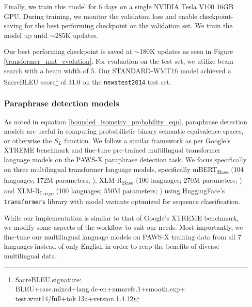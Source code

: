 \documentclass[11pt,a4paper]{article}
\begin{document}
Finally, we train this model for 6 days on a single NVIDIA Tesla V100 16GB GPU.
During training, we monitor the validation loss and enable checkpoint-saving for
the best performing checkpoint on the validation set. We train the model up
until $\sim$285K updates.

Our best performing checkpoint is saved at $\sim$180K updates as seen in Figure
\ref{transformer_nmt_evolution}. For evaluation on the test set, we utilize beam
search with a beam width of 5. Our STANDARD-WMT16 model achieved a SacreBLEU
\cite{post-2018-call} score\footnote{\footnotesize SacreBLEU
  signature:\\BLEU+case.mixed+lang.de\nobreakdash-en+numrefs.1+smooth.exp+\\test.wmt14/full+tok.13a+version.1.4.12}
of 31.0 on the \texttt{newstest2014} test set.

\subsubsection{Paraphrase detection models}

As noted in equation \ref{bounded_isometry_probability_eqn}, paraphrase
detection models are useful in computing probabilistic binary semantic
equivalence spaces, or otherwise the $S_L$ function. We follow a similar
framework as per Google's XTREME benchmark \cite{hu2020xtreme} and fine-tune
pre-trained multilingual transformer language models on the PAWS-X paraphrase
detection task. We focus specifically on three multilingual transformer language
models, specifically mBERT\textsubscript{Base} (104 languages; 172M parameters;
\citealt{devlin-etal-2019-bert}), XLM-R\textsubscript{Base} (100 languages; 270M
parameters; \citealt{conneau2019unsupervised}) and XLM-R\textsubscript{Large}
(100 languages; 550M parameters; \citealt{conneau2019unsupervised}) using
HuggingFace's \texttt{transformers} library \cite{Wolf2019HuggingFacesTS} with
model variants optimized for sequence classification.

While our implementation is similar to that of Google's XTREME benchmark, we
modify some aspects of the workflow to suit our needs. Most importantly, we
fine-tune our multilingual language models on PAWS-X training data from all 7
languages instead of only English in order to reap the benefits of diverse
multilingual data.
\end{document}
